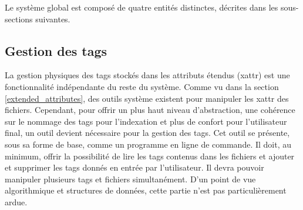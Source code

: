 Le système global est composé de quatre entités distinctes, décrites dans les sous-sections suivantes.

\subsection{Gestion des tags}
La gestion physiques des tags stockés dans les attributs étendus (\acrshort{xattr}) est une fonctionnalité indépendante du 
reste du système. Comme vu dans la section \ref{extended_attributes}, des outils système existent pour 
manipuler les \acrshort{xattr} des fichiers. Cependant, pour offrir un plus haut niveau d'abstraction, 
une cohérence sur le nommage des tags pour l'indexation et plus de confort pour l'utilisateur final, 
un outil devient nécessaire pour la gestion des tags. Cet outil se présente, sous sa forme de base, 
comme un programme en ligne de commande. Il doit, au minimum, offrir la possibilité de lire les tags 
contenus dans les fichiers et ajouter et supprimer les tags donnés en entrée par l'utilisateur. 
Il devra pouvoir manipuler plusieurs tags et fichiers simultanément. D'un point de vue algorithmique 
et structures de données, cette partie n'est pas particulièrement ardue.

